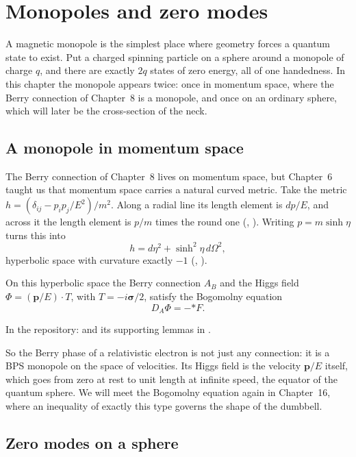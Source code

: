 \chapter{Monopoles and zero modes}\label{ch:monopole}

\begin{questionbox}
A magnetic monopole is the simplest place where geometry forces a quantum state to exist. Put a charged spinning particle on a sphere around a monopole of charge $q$, and there are exactly $2q$ states of zero energy, all of one handedness. In this chapter the monopole appears twice: once in momentum space, where the Berry connection of Chapter~8 is a monopole, and once on an ordinary sphere, which will later be the cross-section of the neck.
\end{questionbox}

\section{A monopole in momentum space}

The Berry connection of Chapter~8 lives on momentum space, but Chapter~6 taught us that momentum space carries a natural curved metric. Take the metric $h=(\delta_{ij}-p_ip_j/E^2)/m^2$. Along a radial line its length element is $dp/E$, and across it the length element is $p/m$ times the round one (, ). Writing $p=m\sinh\eta$ turns this into
\[
h=d\eta^2+\sinh^2\eta\,d\Omega^2 ,
\]
hyperbolic space with curvature exactly $-1$ (, ).

\begin{theorem}\proved\label{thm:bps}
On this hyperbolic space the Berry connection $A_B$ and the Higgs field $\Phi=(\mathbf p/E)\cdot T$, with $T=-i\boldsymbol\sigma/2$, satisfy the Bogomolny equation
\[
D_A\Phi=-{*F}.
\]
\end{theorem}
\noindent In the repository:  and its supporting lemmas in .

So the Berry phase of a relativistic electron is not just any connection: it is a BPS monopole on the space of velocities. Its Higgs field is the velocity $\mathbf p/E$ itself, which goes from zero at rest to unit length at infinite speed, the equator of the quantum sphere. We will meet the Bogomolny equation again in Chapter~16, where an inequality of exactly this type governs the shape of the dumbbell.

\section{Zero modes on a sphere}

